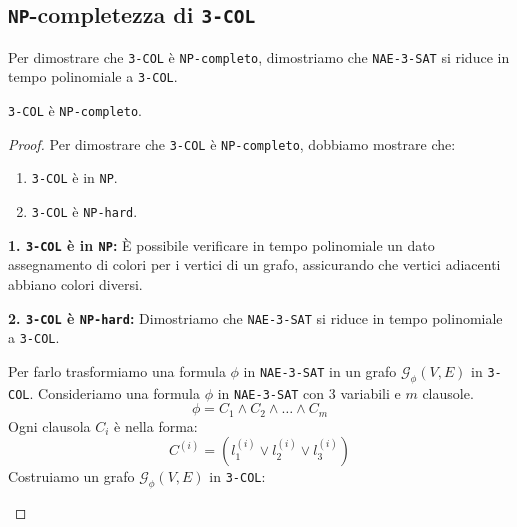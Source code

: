 \subsection{\texttt{NP}-completezza di \texttt{3-COL}}
Per dimostrare che \texttt{3-COL} è \texttt{NP-completo}, dimostriamo che
\texttt{NAE-3-SAT} si riduce in tempo polinomiale a \texttt{3-COL}.
\begin{theorem}
    \texttt{3-COL} è \texttt{NP-completo}.
\end{theorem}
\begin{proof}
    Per dimostrare che \texttt{3-COL} è \texttt{NP-completo}, dobbiamo mostrare che:
    \begin{enumerate}
        \item \texttt{3-COL} è in \texttt{NP}.
        \item \texttt{3-COL} è \texttt{NP-hard}.
    \end{enumerate}
    \textbf{1. \texttt{3-COL} è in \texttt{NP}:} È possibile verificare in tempo
    polinomiale un dato assegnamento di colori per i vertici di un grafo, assicurando
    che vertici adiacenti abbiano colori diversi.

    \textbf{2. \texttt{3-COL} è \texttt{NP-hard}:} Dimostriamo che \texttt{NAE-3-SAT}
    si riduce in tempo polinomiale a \texttt{3-COL}.

    Per farlo trasformiamo una formula $\phi$ in \texttt{NAE-3-SAT} in un grafo $\mathcal{G}_\phi(V, E)$
    in \texttt{3-COL}.
    Consideriamo una formula $\phi$ in \texttt{NAE-3-SAT} con $3$ variabili e $m$ clausole.
    \[
        \phi = C_1 \land C_2 \land \ldots \land C_m
    \]
    Ogni clausola $C_i$ è nella forma:
    \[
        C^{(i)} = (l^{(i)}_1 \lor l^{(i)}_2 \lor l^{(i)}_3)
    \]
    Costruiamo un grafo $\mathcal{G}_\phi(V, E)$ in \texttt{3-COL}:
    \begin{figure}[H]
        \centering 
\end{figure}
\end{proof}
